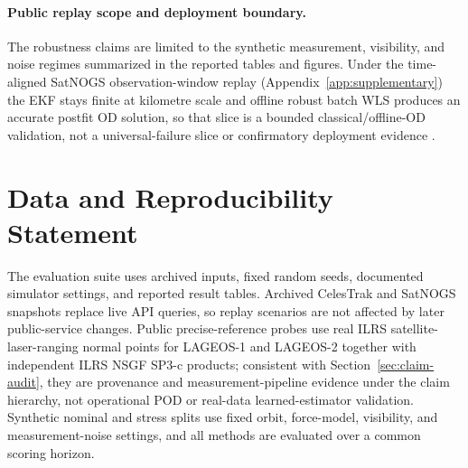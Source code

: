 \documentclass{article}
\begin{document}
\paragraph{Public replay scope and deployment boundary.}
The robustness claims are limited to the synthetic measurement, visibility, and noise regimes summarized in the reported tables and figures. Under the time-aligned SatNOGS observation-window replay (Appendix~\ref{app:supplementary}) the EKF stays finite at kilometre scale and offline robust batch WLS produces an accurate postfit OD solution, so that slice is a bounded classical/offline-OD validation, not a universal-failure slice or confirmatory deployment evidence \cite{satnogs_network}.

\section{Data and Reproducibility Statement}
\label{sec:data-reproducibility}

The evaluation suite uses archived inputs, fixed random seeds, documented simulator settings, and reported result tables. Archived CelesTrak and SatNOGS snapshots replace live API queries, so replay scenarios are not affected by later public-service changes. Public precise-reference probes use real ILRS satellite-laser-ranging normal points for LAGEOS-1 and LAGEOS-2 together with independent ILRS NSGF SP3-c products; consistent with Section~\ref{sec:claim-audit}, they are provenance and measurement-pipeline evidence under the claim hierarchy, not operational POD or real-data learned-estimator validation. Synthetic nominal and stress splits use fixed orbit, force-model, visibility, and measurement-noise settings, and all methods are evaluated over a common scoring horizon.
\end{document}
